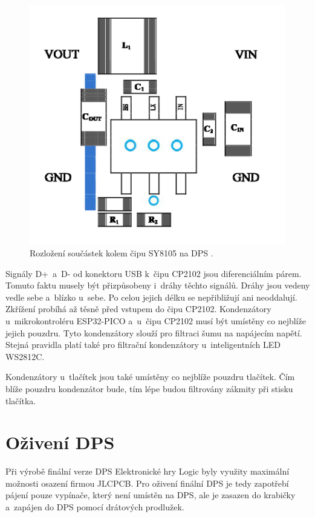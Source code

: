   \begin{figure}[!h]
    \begin{center}
      \includegraphics[scale=1]{obrazky/SY8105_rozlozeni_na_DPS.png}
    \end{center}
    \caption[Rozložení součástek kolem čipu SY8105 na DPS \cite{SY8105_datasheet}]{Rozložení součástek kolem čipu SY8105 na DPS 
    \cite{SY8105_datasheet}.}
  \end{figure}

  Signály D+~a~D- od konektoru USB k~čipu CP2102 jsou diferenciálním párem. Tomuto faktu musely být přizpůsobeny i~dráhy těchto signálů. Dráhy 
  jsou vedeny vedle sebe a~blízko u~sebe. Po celou jejich délku se nepřibližují ani neoddalují. Zkřížení probíhá až těsně před vstupem do čipu CP2102.
  Kondenzátory u~mikrokontroléru ESP32-PICO a~u~čipu CP2102 musí být umístěny co nejblíže jejich pouzdru. Tyto kondenzátory slouží pro 
  filtraci šumu na napájecím napětí. Stejná pravidla platí také pro filtrační kondenzátory u~inteligentních LED WS2812C.

  Kondenzátory u~tlačítek jsou také umístěny co nejblíže pouzdru tlačítek. Čím blíže pouzdru kondenzátor bude, tím lépe budou 
  filtrovány zákmity při stisku tlačítka.

  \chapter{Oživení DPS}
  Při výrobě finální verze DPS Elektronické hry Logic byly využity maximální možnosti osazení firmou JLCPCB.  
  Pro oživení finální DPS je tedy zapotřebí pájení pouze vypínače, který není umístěn na DPS, ale je zasazen do krabičky a~zapájen
  do DPS pomocí drátových prodlužek. 

